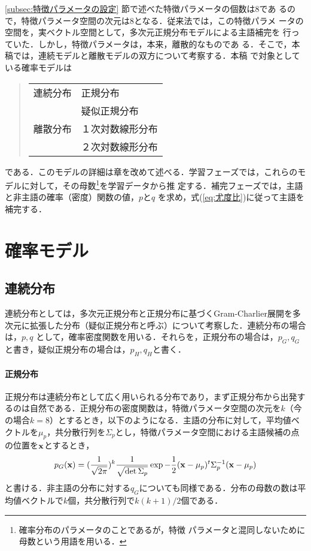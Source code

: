 \ref{subsec:特徴パラメータの設定} 節で述べた特徴パラメータの個数は$8$であ
るので，特徴パラメータ空間の次元は$8$となる．従来法では，この特徴パラメ
ータの空間を，実ベクトル空間として，多次元正規分布モデルによる主語補完を
行っていた\cite{金94}．しかし，特徴パラメータは，本来，離散的なものであ
る．そこで，本稿では，連続モデルと離散モデルの双方について考察する．本稿
で対象としている確率モデルは

\begin{quote} \vspace*{2mm}
\begin{tabular}{ll}
連続分布 & 正規分布 \\
         & 疑似正規分布 \\
離散分布 & １次対数線形分布 \\
         & ２次対数線形分布 \\
\end{tabular}
\vspace*{2mm} \end{quote}
である．このモデルの詳細は章を改めて述べる．学習フェーズでは，これらのモ
デルに対して，その母数\footnote{確率分布のパラメータのことであるが，特徴
  パラメータと混同しないために母数という用語を用いる．}を学習データから推
定する．補完フェーズでは，主語と非主語の確率（密度）関数の値，$p$と$q$ 
を求め，式(\ref{eq:尤度比})に従って主語を補完する．

\section{確率モデル} \label{sec:確率モデル}

\subsection{連続分布} \label{subsec:連続分布}
連続分布としては，多次元正規分布と正規分布に基づくGram-Charlier展開\cite[pp.228-229]{Stuart94}を多次元に拡張した分布（疑似正規分布と呼ぶ）について考察した．連続分布の場合は，$p,q$ として，確率密度関数を用いる．それらを，正規分布の場合は，$p_{G},q_{G}$と書き，疑似正規分布の場合は，$p_{H},q_{H}$と書く．

\paragraph{正規分布}
正規分布は連続分布として広く用いられる分布であり，まず正規分布から出発するのは自然である．正規分布の密度関数は，特徴パラメータ空間の次元を$k$（今の場合$k=8$）とするとき，以下のようになる．主語の分布に対して，平均値ベクトルを$\mu_{p}$，共分散行列を$\Sigma_{p}$とし，特徴パラメータ空間における主語候補の点の位置を${\bf x}$とするとき，
\begin{equation}
 p_{G}({\bf x})=(\frac{1}{\sqrt{2\pi}})^{k}
       \frac{1}{\sqrt{\det{\Sigma_{p}}}}
       \exp{-\frac{1}{2}({\bf x}-\mu_{p})^{t}\Sigma_{p}^{-1}
        ({\bf x}-\mu_{p})}
\end{equation}
と書ける．非主語の分布に対する$q_{G}$についても同様である．分布の母数の数は平均値ベクトルで$k$個，共分散行列で$k(k+1)/2$個である．

